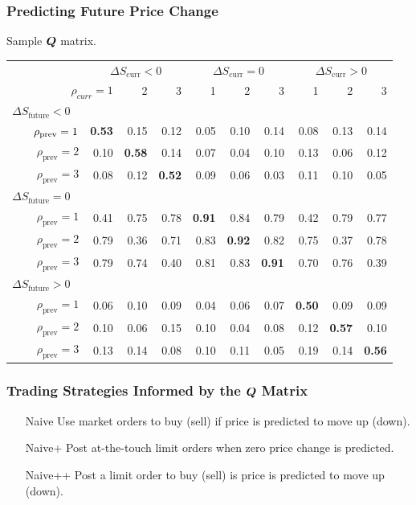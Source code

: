 \begin{frame}
\frametitle{Predicting Future Price Change}
Sample $\boldsymbol{Q}$ matrix.
\begin{table}%
%
\begin{adjustbox}{width=\textwidth}
\begin{tabular}{@{} r@{\hskip 1cm} *{9}{r} @{}}%
\toprule
& \multicolumn{3}{c}{$\Delta S_\text{curr} < 0$} & \multicolumn{3}{c}{$\Delta S_\text{curr} = 0$} & \multicolumn{3}{c}{$\Delta S_\text{curr} > 0$} \\
\cmidrule(lr){2-4} \cmidrule(lr){5-7} \cmidrule(lr){8-10}
\multicolumn{2}{r}{$\rho_{curr} = 1$} & 2 & 3 & 1 & 2 & 3 & 1 & 2 & 3 \\
\midrule
\multicolumn{10}{l}{$\Delta S_\text{future} < 0$} \\
$\hphantom{abcd}\rho_\text{prev} = 1$ & \bf 0.53 & 0.15 & 0.12 & 0.05 & 0.10 & 0.14 & 0.08 & 0.13 & 0.14 \\
$\rho_\text{prev} = 2$ & 0.10 & \bf 0.58 & 0.14 & 0.07 & 0.04 & 0.10 & 0.13 & 0.06 & 0.12 \\
$\rho_\text{prev} = 3$ & 0.08 & 0.12 & \bf 0.52 & 0.09 & 0.06 & 0.03 & 0.11 & 0.10 & 0.05 \\[0.6ex]
\multicolumn{10}{l}{$\Delta S_\text{future} = 0$} \\
$\rho_\text{prev} = 1$ & 0.41 & 0.75 & 0.78 & \bf 0.91 & 0.84 & 0.79 & 0.42 & 0.79 & 0.77 \\
$\rho_\text{prev} = 2$ & 0.79 & 0.36 & 0.71 & 0.83 & \bf 0.92 & 0.82 & 0.75 & 0.37 & 0.78 \\
$\rho_\text{prev} = 3$ & 0.79 & 0.74 & 0.40 & 0.81 & 0.83 & \bf 0.91 & 0.70 & 0.76 & 0.39 \\[0.6ex]
\multicolumn{10}{l}{$\Delta S_\text{future} > 0$} \\
$\rho_\text{prev} = 1$ & 0.06 & 0.10 & 0.09 & 0.04 & 0.06 & 0.07 & \bf 0.50 & 0.09 & 0.09 \\
$\rho_\text{prev} = 2$ & 0.10 & 0.06 & 0.15 & 0.10 & 0.04 & 0.08 & 0.12 & \bf 0.57 & 0.10 \\
$\rho_\text{prev} = 3$ & 0.13 & 0.14 & 0.08 & 0.10 & 0.11 & 0.05 & 0.19 & 0.14 & \bf 0.56 \\
\bottomrule
\end{tabular}%
\end{adjustbox}%
\end{table}%
\end{frame}

\begin{frame}
\frametitle{Trading Strategies Informed by the $\boldsymbol{Q}$ Matrix}
\begin{itemize}
\item[Naive] Use market orders to buy (sell) if price is predicted to move up (down).
\item[Naive+] Post at-the-touch limit orders when zero price change is predicted.
\item[Naive++] Post a limit order to buy (sell) is price is predicted to move up (down).
\end{itemize}
\end{frame}

